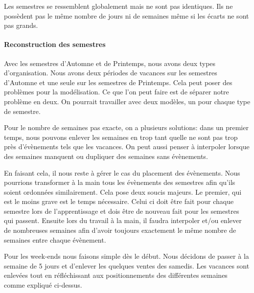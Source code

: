 Les semestres se ressemblent globalement mais ne sont pas identiques. Ils ne possèdent pas le même nombre de jours ni de semaines même si les écarts ne sont pas grands.

\paragraph{Reconstruction des semestres}

Avec les semestres d'Automne et de Printemps, nous avons deux types d'organisation. Nous avons deux périodes de vacances sur les semestres d'Automne et une seule sur les semestres de Printemps. Cela peut poser des problèmes pour la modélisation. Ce que l'on peut faire est de séparer notre problème en deux. On pourrait travailler avec deux modèles, un pour chaque type de semestre.

Pour le nombre de semaines pas exacte, on a plusieurs solutions: dans un premier temps, nous pouvons enlever les semaines en trop tant quelle ne sont pas trop près d'évènements tels que les vacances. On peut aussi penser à interpoler lorsque des semaines manquent ou dupliquer des semaines sans évènements.

En faisant cela, il nous reste à gérer le cas du placement des évènements. Nous pourrions transformer à la main tous les évènements des semestres afin qu'ils soient ordonnées similairement. Cela pose deux soucis majeurs. Le premier, qui est le moins grave est le temps nécessaire. Celui ci doit être fait pour chaque semestre lors de l'apprentissage et dois être de nouveau fait pour les semestres qui passent. Ensuite lors du travail à la main, il faudra interpoler et/ou enlever de nombreuses semaines afin d'avoir toujours exactement le même nombre de semaines entre chaque évènement.

Pour les week-ends nous faisons simple dès le début. Nous décidons de passer à la semaine de 5 jours et d'enlever les quelques ventes des samedis. Les vacances sont enlevées tout en réfléchissant aux positionnements des différentes semaines comme expliqué ci-dessus.

